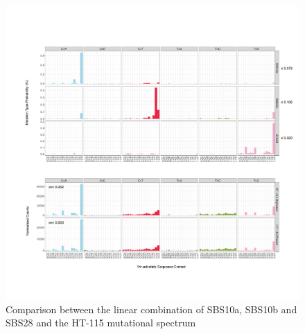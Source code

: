 \begin{figure}[htbp!]
\caption{Comparison between the linear combination of SBS10a, SBS10b and SBS28 and the HT-115 mutational spectrum}
\label{figure:HT-115}
\includegraphics[width=\textwidth]{Vector/hg19.SBS10a.SBS10b.SBS28.HT-115.pdf}
\end{figure}

